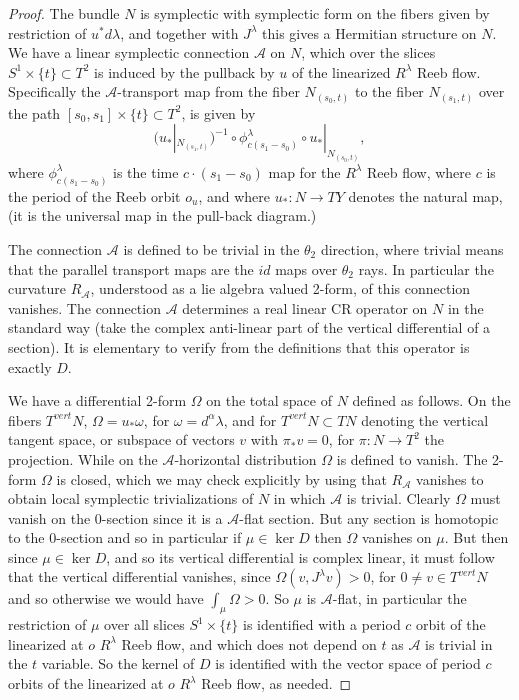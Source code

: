 \documentclass{amsart}
\numberwithin{equation}{section}
\theoremstyle{definition}
\theoremstyle{remark}
\begin{document}
\begin{proof}
The bundle $N$ is symplectic with symplectic form on
the fibers given by restriction of $u ^{*} d \lambda$, and together with $J
^{\lambda} $ this gives a Hermitian structure on $N $. We have a
linear symplectic connection $\mathcal{A}$ on $N$, which over the slices $S ^{1}
\times \{t\} \subset T ^{2} $ is induced by the  pullback
by $u$ of the linearized $R  ^{\lambda} $ Reeb flow. Specifically the $\mathcal{A}$-transport map from the fiber $N  _{(s _{0} , t)}  $ to the fiber $N  _{(s _{1}, t)}  $ over the path $ [s _{0}, s _{1} ]
\times \{t\} \subset T ^{2} $,  is given by $$(u_*| _{N  _{(s _{1}, t)}  }) ^{-1}  \circ \phi ^{\lambda}
_{c(s _{1}  - s _{0})} 
\circ u_*| _{N _{(s _{0} , t  )}  }, $$ 
where $\phi ^{\lambda} 
   _{c(s _{1}  - s _{0})} $ is the time $c \cdot (s _{1}  - s _{0} )$ map for the $R ^{\lambda} $ Reeb flow, where $c$ is the period of the Reeb orbit $o _{u} $,
   and where $u _{*}: N \to TY $ denotes the natural map, (it is the universal map in the pull-back diagram.)

The connection $\mathcal{A}$ is defined to be trivial in the $\theta
_{2} $ direction, where trivial means that the parallel transport  maps are
the
$id$ maps over $\theta _{2} $ rays.  In particular the curvature $R _{\mathcal{A}} $, understood as a lie algebra valued 2-form, of this connection
vanishes. The connection $\mathcal{A}$ determines a real linear CR operator on
$N$ in the standard way (take the complex anti-linear part of
the vertical differential of a section).  It is elementary to verify from the definitions that this
operator is exactly $D$. 

We have a differential 2-form $\Omega$ on the total space of $N$ 
defined as follows. On the fibers $T ^{vert} N$, $\Omega= u _{*}  \omega $, for $\omega= d ^{\alpha} \lambda $, and for $T ^{vert} N \subset TN$ denoting the vertical tangent space, or subspace of vectors $v$ with $\pi _{*} v =0 $, for $\pi: N \to T ^{2} $ the projection. While on the $\mathcal{A}$-horizontal distribution 
$\Omega$ is defined to vanish.
The 2-form $\Omega$ is closed, which we may check explicitly by using that $R _{\mathcal{A}} $ vanishes
to obtain local symplectic trivializations of $N$ in which $\mathcal{A}$ is trivial.
Clearly $\Omega$ must vanish on the
0-section since it is a $\mathcal{A}$-flat section. But any section is homotopic to
the 0-section and so in particular if $\mu \in \ker D$ then $\Omega$
vanishes on $\mu$. But then since $\mu \in \ker D$, and so its
vertical differential is complex linear, it must follow that
the vertical differential  vanishes, since $\Omega (v, J ^{\lambda}v )
>0$, for $0 \neq v \in T ^{vert}N$ and so otherwise we would
have $\int _{\mu} \Omega>0 $. So $\mu$ is
$\mathcal{A}$-flat, in particular the
restriction of $\mu$ over all slices $S ^{1} \times \{t\} $ is
identified with a period $c$ orbit of the linearized at $o$
$R ^{\lambda} $ Reeb flow, and which
does not depend on $t$ as $\mathcal{A}$ is trivial in the $t$ variable. So the kernel of $D$ is identified with the vector
space of period $c$ orbits of the linearized at $o$ $R
^{\lambda} $ Reeb flow, as needed. 
\end{proof}
\end{document}
